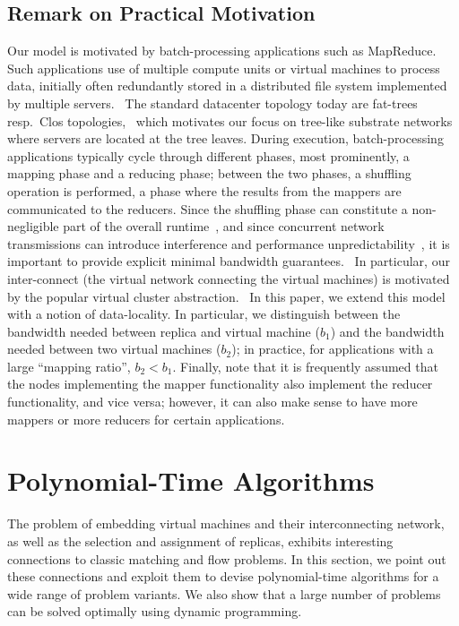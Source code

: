 \documentclass[9pt,twocolumn]{scrartcl}
\newcommand{\CostTrans}{\ensuremath{b_1}}
\newcommand{\CostCom}{\ensuremath{b_2}}
\begin{document}

\subsection{Remark on Practical Motivation}

Our model is motivated by batch-processing applications such as MapReduce.
Such applications use of multiple compute units or virtual machines to
process data, initially often redundantly stored in a distributed file system implemented
by multiple servers.~\cite{mapreduce}
The standard datacenter topology today are fat-trees resp.~Clos topologies,~\cite{fattree}
which motivates our focus on tree-like substrate networks where servers are located at the
tree leaves.
During execution, batch-processing applications typically cycle through different phases,
most prominently, a mapping phase and a reducing phase; between the two phases,
a shuffling operation is performed, a phase where the results from the mappers
are communicated to the reducers. Since the shuffling phase can constitute a
non-negligible part of the overall runtime~\cite{orchestra},
and since concurrent network transmissions can introduce interference and
performance unpredictability~\cite{amazonbw}, it is important
to provide explicit minimal bandwidth guarantees.~\cite{talk-about}
In particular, our inter-connect (the virtual network connecting the virtual machines)
is motivated by the popular virtual cluster abstraction.~\cite{oktopus,talk-about,proteus}
In this paper, we extend this model with a notion of data-locality.
In particular, we distinguish between the bandwidth needed between replica
and virtual machine ($\CostTrans$) and the bandwidth needed between
two virtual machines ($\CostCom$); in practice, for applications with a large 
``mapping ratio'', $\CostCom<\CostTrans$. Finally, note that it is frequently assumed
that the nodes implementing the mapper functionality also implement the reducer functionality,
and vice versa; however, it can also make sense to have more mappers or more reducers for
certain applications.

\section{Polynomial-Time Algorithms}\label{sec:poly}

The problem of embedding virtual machines and their interconnecting network,
as well as the selection and assignment of replicas,
exhibits interesting connections to classic matching and
flow problems. In this section, we point out these connections and
exploit them to devise polynomial-time algorithms for a wide range
of problem variants. We also show that a large number of problems
can be solved optimally using dynamic programming.
\end{document}
